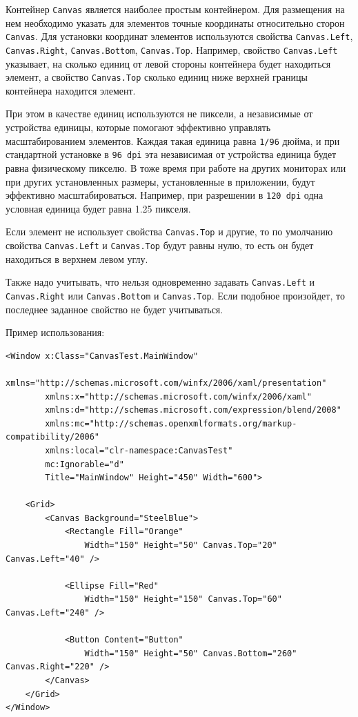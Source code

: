 Контейнер \texttt{Canvas} является наиболее простым контейнером. Для размещения на нем необходимо указать для элементов точные координаты относительно сторон \texttt{Canvas}. Для установки координат элементов используются свойства \texttt{Canvas.Left}, \texttt{Canvas.Right}, \texttt{Canvas.Bottom}, \texttt{Canvas.Top}. Например, свойство \texttt{Canvas.Left} указывает, на сколько единиц от левой стороны контейнера будет находиться элемент, а свойство \texttt{Canvas.Top} сколько единиц ниже верхней границы контейнера находится элемент.

При этом в качестве единиц используются не пиксели, а независимые от устройства единицы, которые помогают эффективно управлять масштабированием элементов. Каждая такая единица равна \texttt{1/96} дюйма, и при стандартной установке в \texttt{96 dpi} эта независимая от устройства единица будет равна физическому пикселю. В тоже время при работе на других мониторах или при других установленных размеры, установленные в приложении, будут эффективно масштабироваться. Например, при разрешении в \texttt{120 dpi} одна условная единица будет равна 1.25 пикселя.

Если элемент не использует свойства \texttt{Canvas.Top} и другие, то по умолчанию свойства \texttt{Canvas.Left} и \texttt{Canvas.Top} будут равны нулю, то есть он будет находиться в верхнем левом углу.

Также надо учитывать, что нельзя одновременно задавать \texttt{Canvas.Left} и \texttt{Canvas.Right} или \texttt{Canvas.Bottom} и \texttt{Canvas.Top}. Если подобное произойдет, то последнее заданное свойство не будет учитываться. 

Пример использования:

\begin{verbatim}
<Window x:Class="CanvasTest.MainWindow"
        xmlns="http://schemas.microsoft.com/winfx/2006/xaml/presentation"
        xmlns:x="http://schemas.microsoft.com/winfx/2006/xaml"
        xmlns:d="http://schemas.microsoft.com/expression/blend/2008"
        xmlns:mc="http://schemas.openxmlformats.org/markup-compatibility/2006"
        xmlns:local="clr-namespace:CanvasTest"
        mc:Ignorable="d"
        Title="MainWindow" Height="450" Width="600">

    <Grid>
        <Canvas Background="SteelBlue">
            <Rectangle Fill="Orange" 
                Width="150" Height="50" Canvas.Top="20" Canvas.Left="40" />
                
            <Ellipse Fill="Red" 
                Width="150" Height="150" Canvas.Top="60" Canvas.Left="240" />
                
            <Button Content="Button" 
                Width="150" Height="50" Canvas.Bottom="260" Canvas.Right="220" />
        </Canvas>
    </Grid>
</Window>
\end{verbatim}

